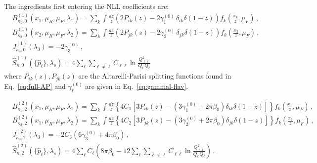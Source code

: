 The ingredients first entering the NLL coefficients are:
\begin{subequations}
\label{eq:C10-ingred}
\begin{align}
&B_{\kappa_{1},0}^{(1)}(x_1,\mu_R,\mu_F,\lambda_1)=\sum_k \int\frac{dz}{z} \left(2P_{ik}(z)-2\gamma_1^{(0)}\,\delta_{ik}\delta(1-z)\right)
f_k\left(\frac{x_1}{z},\mu_F\right)\,, \\[1ex]
&B_{\kappa_{2},0}^{(1)}(x_2,\mu_R,\mu_F,\lambda_2)  =\sum_k \int\frac{dz}{z} \left(2P_{jk}(z)-2\gamma_2^{(0)}\,\delta_{jk}\delta(1-z)\right)
f_k\left(\frac{x_2}{z},\mu_F\right)\,, \\[1ex]
&J_{\kappa_3,0}^{(1)}(\lambda_3) = -2\gamma_3^{(0)}\,, \\[1ex]
&\widehat{S}_{\kappa,0}^{(1)}\left(\{\hat{p}_{\ell}\},\lambda_s\right)=4\sum_{\ell}\sum_{\bar{\ell}\neq\ell}C_{\ell\bar\ell}\ln\frac{Q_{\ell\bar{\ell}}^2}{Q_{\ell}\,Q_{\bar{\ell}}}
\end{align}
\end{subequations}
where $P_{ik}(z), P_{jk}(z)$ are the Altarelli-Parisi splitting functions found in Eq.~\eqref{eq:full-AP}
and $\gamma^{(0)}_{\ell}$ are given in Eq.~\eqref{eq:gammal-flav}.

\begin{subequations}
\label{eq:C22-ingred}
\begin{align}
&B_{\kappa_{1},2}^{(2)}(x_1,\mu_R,\mu_F,\lambda_1) = \sum_{k}\int\frac{dz}{z}\left\{4C_1\left[
    3P_{ik}(z) -\left(3\gamma_1^{(0)}+2\pi\beta_0\right)\delta_{ik}\delta(1-z)
   \right]\right\}f_k\left(\frac{x_1}{z},\mu_F\right)\,, \\[1ex]
&B_{\kappa_{2},2}^{(2)}(x_1,\mu_R,\mu_F,\lambda_2) = \sum_{k}\int\frac{dz}{z}\left\{4C_2\left[
    3P_{jk}(z) -\left(3\gamma_2^{(0)}+2\pi\beta_0\right)\delta_{jk}\delta(1-z)
   \right]\right\}f_k\left(\frac{x_2}{z},\mu_F\right)\,, \\[1ex]
 &J_{\kappa_3,2}^{(2)}(\lambda_3) = -2C_3\left(6\gamma_3^{(0)}+4\pi\beta_0\right)\,, \\[1ex]
&\widehat{S}_{\kappa,2}^{(2)}\left(\{\hat{p}_{\ell}\},\lambda_s\right)  =
    4\sum_{\ell}C_{\ell}\left(8\pi\beta_0-12\sum_{\ell}\sum_{\bar{\ell}\neq\ell}C_{\ell\bar\ell}\ln\frac{Q_{\ell\bar{\ell}}^2}{Q_{\ell}\,Q_{\bar{\ell}}}\right)\,.
\end{align}
\end{subequations}

